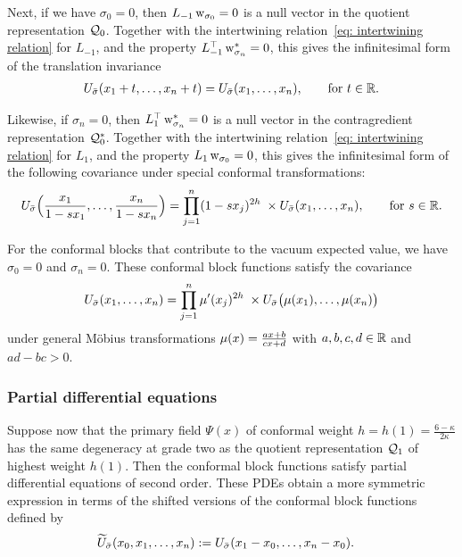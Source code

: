 \documentclass[oneside,english]{amsart}
\numberwithin{equation}{section}
\numberwithin{figure}{section}
\theoremstyle{plain}
\theoremstyle{plain}
\theoremstyle{plain}
\theoremstyle{remark}
\theoremstyle{plain}
\theoremstyle{plain}
\theoremstyle{plain}
\theoremstyle{plain}
\theoremstyle{plain}
\theoremstyle{plain}
\theoremstyle{plain}
\theoremstyle{plain}
\newcommand{\blue}[1]{{\color{blue} #1}}
\newcommand{\red}[1]{{\color{red} #1}}
\begin{document}
Next, if we have $\sigma_0 = 0$, then
$L_{-1} \, \mathrm{w}_{\sigma_0} = 0$ 
is a null vector in the quotient representation $\mathcal{Q}_0$.
Together with the intertwining relation~\eqref{eq: intertwining relation} for $L_{-1}$, and the property $L_{-1}^\top \, \mathrm{w}^*_{\sigma_n} = 0$,
this gives the infinitesimal form of 
the translation invariance
\begin{align*} %
U_{\sigmaseq}(x_{1} + t, \ldots, x_{n} + t)
    = U_{\sigmaseq}(x_{1}, \ldots, x_{n})
    , \qquad\text{for } t \in \bR .
\end{align*}

Likewise, if $\sigma_n = 0$, then $L_1^\top \, \mathrm{w}_{\sigma_n}^* = 0$
is a null vector in the contragredient representation $\mathcal{Q}_0^*$. Together with the intertwining relation~\eqref{eq: intertwining relation} for $L_1$, and the property $L_{1} \, \mathrm{w}_{\sigma_0} = 0$,
this gives the infinitesimal form of the following covariance under special conformal transformations:
\begin{align*}
U_{\bar{\sigma}} \Big( \frac{x_{1}}{1 - s x_1}, \ldots, \frac{x_{n}}{1 - s x_n} \Big)
    = \prod_{j=1}^n (1 - s x_j)^{2h} \; \times  U_{\bar{\sigma}}(x_{1}, \ldots, x_{n})
    , \qquad\text{for } s \in \mathbb{R} .
\end{align*}

For the conformal blocks that contribute to the vacuum expected value, we
have %
$\sigma_0 = 0$ and $\sigma_n = 0$. These conformal block functions satisfy the covariance
\begin{align*} %
U_{\sigmaseq}(x_{1}, \ldots, x_{n})
= \prod_{j=1}^n \Mob'(x_j)^{2h} \; \times U_{\sigmaseq} \big( \Mob(x_1), \ldots, \Mob(x_n) \big)
\end{align*}
under general M\"obius transformations $\mu(x) = \frac{a x + b}{c x + d}$
with $a,b,c,d \in \mathbb{R}$ and $ad-bc>0$.

\subsubsection{\textbf{Partial differential equations}}


Suppose now that the primary field $\Psi(x)$ of conformal weight $h=h(1)=\frac{6-\kappa}{2 \kappa}$ has the same 
degeneracy at grade %
two as the quotient representation $\mathcal{Q}_{1}$ of highest weight $h(1)$. %
Then the conformal block functions satisfy partial differential equations of second order.
These PDEs obtain a more symmetric expression in terms of the shifted
versions of the conformal block functions defined by
\begin{align*}
\widetilde{U}_{\bar{\sigma}}(x_{0},x_{1},\ldots,x_{n}) :=\; & U_{\bar{\sigma}}(x_{1}-x_{0},\ldots,x_{n}-x_{0}).
\end{align*}
\end{document}
